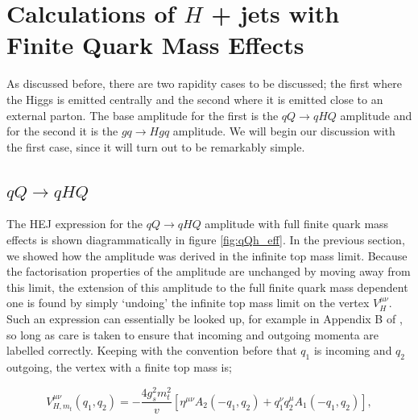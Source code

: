 \section{Calculations of $H$ + jets with Finite Quark Mass Effects}

As discussed before, there are two rapidity cases to be discussed; the first where the Higgs is emitted centrally and the second where it is emitted close to an external parton. The base amplitude for the first is the $qQ \to qHQ$ amplitude and for the second it is the $gq \to Hgq$ amplitude. We will begin our discussion with the first case, since it will turn out to be remarkably simple. 

\subsection{$qQ \to qHQ$}

The HEJ expression for the $qQ \to qHQ$ amplitude with full finite quark mass effects is shown diagrammatically in figure \ref{fig:qQh_eff}. In the previous section, we showed how the amplitude was derived in the infinite top mass limit. Because the factorisation properties of the amplitude are unchanged by moving away from this limit, the extension of this amplitude to the full finite quark mass dependent one is found by simply `undoing' the infinite top mass limit on the vertex $V_H^{\mu \nu}$. Such an expression can essentially be looked up, for example in Appendix B of \cite{Duca2003}, so long as care is taken to ensure that incoming and outgoing momenta are labelled correctly. Keeping with the convention before that $q_1$ is incoming and $q_2$ outgoing, the vertex with a finite top mass is;

\begin{equation}
V^{\mu \nu}_{H, m_t}(q_1, q_2) = -\frac{4 g_s^2 m_t^2}{v} \left[\eta^{\mu \nu}A_2(-q_1,q_2) + q_1^\nu q_2^\mu A_1(-q_1,q_2) \right],
\end{equation}


